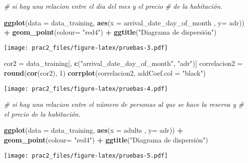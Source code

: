 \documentclass[]{article}
\newenvironment{Shaded}{\begin{snugshade}}{\end{snugshade}}
\newcommand{\CommentTok}[1]{\textcolor[rgb]{0.56,0.35,0.01}{\textit{#1}}}
\newcommand{\DataTypeTok}[1]{\textcolor[rgb]{0.13,0.29,0.53}{#1}}
\newcommand{\DecValTok}[1]{\textcolor[rgb]{0.00,0.00,0.81}{#1}}
\newcommand{\KeywordTok}[1]{\textcolor[rgb]{0.13,0.29,0.53}{\textbf{#1}}}
\newcommand{\NormalTok}[1]{#1}
\newcommand{\OperatorTok}[1]{\textcolor[rgb]{0.81,0.36,0.00}{\textbf{#1}}}
\newcommand{\StringTok}[1]{\textcolor[rgb]{0.31,0.60,0.02}{#1}}
\begin{document}
\begin{Shaded}
\begin{Highlighting}[]
\CommentTok{# si hay una relacion entre el dia del mes y el precio}
\CommentTok{# de la habitación.}

\KeywordTok{ggplot}\NormalTok{(}\DataTypeTok{data =}\NormalTok{ data_training, }\KeywordTok{aes}\NormalTok{(}\DataTypeTok{x =}\NormalTok{ arrival_date_day_of_month , }\DataTypeTok{y=}\NormalTok{ adr)) }\OperatorTok{+}
\StringTok{  }\KeywordTok{geom_point}\NormalTok{(}\DataTypeTok{colour=} \StringTok{"red4"}\NormalTok{) }\OperatorTok{+}
\StringTok{  }\KeywordTok{ggtitle}\NormalTok{(}\StringTok{"Diagrama de dispersión")}
\end{Highlighting}
\end{Shaded}

\texttt{[image: prac2\_files/figure-latex/pruebas-3.pdf]}

\begin{Shaded}
\begin{Highlighting}[]
\NormalTok{cor2 =}\StringTok{ }\NormalTok{data_training[, }\KeywordTok{c}\NormalTok{(}\StringTok{"arrival_date_day_of_month"}\NormalTok{, }\StringTok{"adr"}\NormalTok{)]}
\NormalTok{correlacion2 =}\StringTok{ }\KeywordTok{round}\NormalTok{(}\KeywordTok{cor}\NormalTok{(cor2), }\DecValTok{1}\NormalTok{)}
\KeywordTok{corrplot}\NormalTok{(correlacion2, }\DataTypeTok{addCoef.col =} \StringTok{"black"}\NormalTok{)}
\end{Highlighting}
\end{Shaded}

\texttt{[image: prac2\_files/figure-latex/pruebas-4.pdf]}

\begin{Shaded}
\begin{Highlighting}[]
\CommentTok{# si hay una relacion entre el número de personas al que se hace la reserva y}
\CommentTok{# el precio de la habitación.}

\KeywordTok{ggplot}\NormalTok{(}\DataTypeTok{data =}\NormalTok{ data_training, }\KeywordTok{aes}\NormalTok{(}\DataTypeTok{x =}\NormalTok{ adults , }\DataTypeTok{y=}\NormalTok{ adr)) }\OperatorTok{+}
\StringTok{  }\KeywordTok{geom_point}\NormalTok{(}\DataTypeTok{colour=} \StringTok{"red4"}\NormalTok{) }\OperatorTok{+}
\StringTok{  }\KeywordTok{ggtitle}\NormalTok{(}\StringTok{"Diagrama de dispersión")}
\end{Highlighting}
\end{Shaded}

\texttt{[image: prac2\_files/figure-latex/pruebas-5.pdf]}
\end{document}
